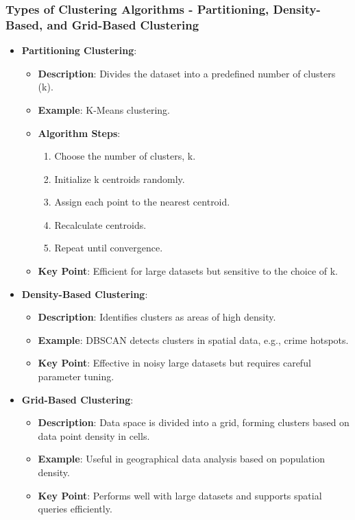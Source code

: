 \documentclass[aspectratio=169]{beamer}
\begin{document}
\begin{frame}[fragile]
    \frametitle{Types of Clustering Algorithms - Partitioning, Density-Based, and Grid-Based Clustering}

    \begin{itemize}
        \item \textbf{Partitioning Clustering}:
        \begin{itemize}
            \item \textbf{Description}: Divides the dataset into a predefined number of clusters (k). 
            \item \textbf{Example}: K-Means clustering.
            \item \textbf{Algorithm Steps}:
            \begin{enumerate}
                \item Choose the number of clusters, k.
                \item Initialize k centroids randomly.
                \item Assign each point to the nearest centroid.
                \item Recalculate centroids.
                \item Repeat until convergence.
            \end{enumerate}
            \item \textbf{Key Point}: Efficient for large datasets but sensitive to the choice of k.
        \end{itemize}

        \item \textbf{Density-Based Clustering}:
        \begin{itemize}
            \item \textbf{Description}: Identifies clusters as areas of high density.
            \item \textbf{Example}: DBSCAN detects clusters in spatial data, e.g., crime hotspots.
            \item \textbf{Key Point}: Effective in noisy large datasets but requires careful parameter tuning.
        \end{itemize}

        \item \textbf{Grid-Based Clustering}:
        \begin{itemize}
            \item \textbf{Description}: Data space is divided into a grid, forming clusters based on data point density in cells.
            \item \textbf{Example}: Useful in geographical data analysis based on population density.
            \item \textbf{Key Point}: Performs well with large datasets and supports spatial queries efficiently.
        \end{itemize}
    \end{itemize}
\end{frame}
\end{document}
